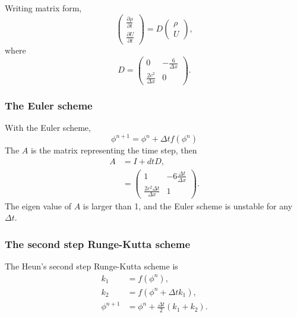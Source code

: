 Writing matrix form,
\begin{equation}
  \begin{pmatrix}
    \frac{\partial \rho}{\partial t} \\
    \frac{\partial U}{\partial t}
  \end{pmatrix}
  = D
  \begin{pmatrix}
    \rho \\
    U
  \end{pmatrix},
\end{equation}
where
\begin{equation}
  D =
  \begin{pmatrix}
    0 & -\frac{6}{\Delta x} \\
    \frac{2c^2}{\Delta x} & 0
  \end{pmatrix}.
\end{equation}

\subsubsection{The Euler scheme}
With the Euler scheme,
\begin{equation}
  \phi^{n+1} = \phi^n + \Delta t f(\phi^n)
\end{equation}
The $A$ is the matrix representing the time step, then
\begin{align}
  A &= I + dt D, \\
    &= \begin{pmatrix}
    1 & -6\frac{\Delta t}{\Delta x} \\
    \frac{2c^2\Delta t}{\Delta x} & 1
    \end{pmatrix}.
\end{align}
The eigen value of $A$ is larger than 1, and the Euler scheme is unstable for any $\Delta t$.


\subsubsection{The second step Runge-Kutta scheme}
The Heun's second step Runge-Kutta scheme is
\begin{align}
  k_1 &= f(\phi^n), \\
  k_2 &= f(\phi^n + \Delta t k_1), \\
  \phi^{n+1} &= \phi^n + \frac{\Delta t}{2}(k_1 + k_2).
\end{align}

